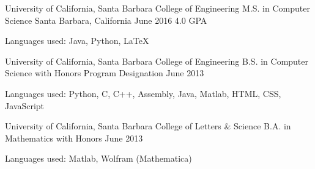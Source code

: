 \begin{cventries}
  \cventry
    {University of California, Santa Barbara \newline College of Engineering}
    {M.S. in Computer Science%
}
    {Santa Barbara, California}
    {June 2016 \newline\vspace{-1mm} 4.0 GPA}
    {
    \begin{cvitems}
	\item {\scriptsize{Languages used: Java, Python, \LaTeX}}
	\end{cvitems}
    }
\cventry
    {University of California, Santa Barbara \newline College of Engineering}
    {B.S. in Computer Science\newline\vspace{-1mm} {\scriptsize \textmd{with Honors Program Designation}}}
    {}
    {June 2013}{
    \begin{cvitems}
	\item {\scriptsize{Languages used: Python, C, C++, Assembly, Java, Matlab, HTML, CSS, JavaScript}}
	\end{cvitems}
}
\cventry
    {University of California, Santa Barbara \newline College of Letters \& Science}
    {B.A. in Mathematics \newline\vspace{-1mm} {\scriptsize \textmd{with Honors}}}
    {    }
    {June 2013}{\begin{cvitems}
	\item {\scriptsize{Languages used: Matlab, Wolfram (Mathematica)}}
	\end{cvitems}}
\end{cventries}